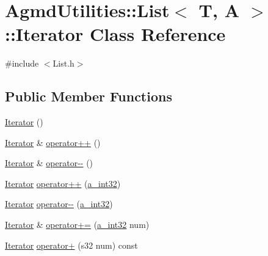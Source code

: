 \hypertarget{class_agmd_utilities_1_1_list_1_1_iterator}{\section{Agmd\+Utilities\+:\+:List$<$ T, A $>$\+:\+:Iterator Class Reference}
\label{class_agmd_utilities_1_1_list_1_1_iterator}
}


{\ttfamily \#include $<$List.\+h$>$}

\subsection*{Public Member Functions}
\begin{DoxyCompactItemize}
\item 
\hyperlink{class_agmd_utilities_1_1_list_1_1_iterator_a54811d63406be211d38c780ad219cb39}{Iterator} ()
\item 
\hyperlink{class_agmd_utilities_1_1_list_1_1_iterator}{Iterator} \& \hyperlink{class_agmd_utilities_1_1_list_1_1_iterator_a367ab68e3ab890b414f40e4236cf937f}{operator++} ()
\item 
\hyperlink{class_agmd_utilities_1_1_list_1_1_iterator}{Iterator} \& \hyperlink{class_agmd_utilities_1_1_list_1_1_iterator_aac7d592a860b2608a6114b43aee63e2d}{operator-\/-\/} ()
\item 
\hyperlink{class_agmd_utilities_1_1_list_1_1_iterator}{Iterator} \hyperlink{class_agmd_utilities_1_1_list_1_1_iterator_a8cbb542ba0984a1590268f9523ad845e}{operator++} (\hyperlink{_common_defines_8h_ae2e4316e0b924774484a728669bebc9b}{a\+\_\+int32})
\item 
\hyperlink{class_agmd_utilities_1_1_list_1_1_iterator}{Iterator} \hyperlink{class_agmd_utilities_1_1_list_1_1_iterator_a0c767f4a122e9b9590c9d9fbcbe8dd06}{operator-\/-\/} (\hyperlink{_common_defines_8h_ae2e4316e0b924774484a728669bebc9b}{a\+\_\+int32})
\item 
\hyperlink{class_agmd_utilities_1_1_list_1_1_iterator}{Iterator} \& \hyperlink{class_agmd_utilities_1_1_list_1_1_iterator_a0b32bfa7edae0e537b597a91713658e7}{operator+=} (\hyperlink{_common_defines_8h_ae2e4316e0b924774484a728669bebc9b}{a\+\_\+int32} num)
\item 
\hyperlink{class_agmd_utilities_1_1_list_1_1_iterator}{Iterator} \hyperlink{class_agmd_utilities_1_1_list_1_1_iterator_a9359811d39fbf632ee28dea78457bdc3}{operator+} (s32 num) const 
\item 

\end{DoxyCompactItemize}
